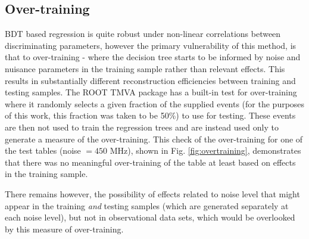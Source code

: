 \documentclass[main.tex]{subfiles}
\begin{document}
\subsection{Over-training}
BDT based regression is quite robust under non-linear correlations between discriminating parameters, however the primary vulnerability of this method, is that  to over-training - where the decision tree starts to be informed by noise and nuisance parameters in the training sample rather than relevant effects. This results in substantially different reconstruction efficiencies between training and testing samples. The ROOT TMVA package has a built-in test for over-training where it randomly selects a given fraction of the supplied events (for the purposes of this work, this fraction was taken to be 50\%) to use for testing. These events are then not used to train the regression trees and are instead used only to generate a measure of the over-training.
This check of the over-training for one of the test tables (noise $= 450$ MHz), shown in Fig. \ref{fig:overtraining}, demonstrates that there was no meaningful over-training of the table at least based on effects in the training sample.

There remains however, the possibility of effects related to noise level that might appear in the training \textit{and} testing samples (which are generated separately at each noise level), but not in observational data sets, which would be overlooked by this measure of over-training.
\end{document}
